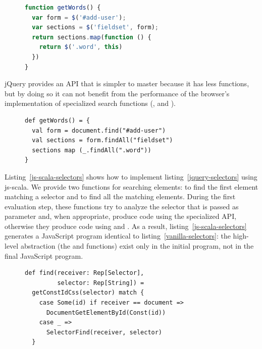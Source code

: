 \documentclass[preprint]{sigplanconf}
\begin{document}
\begin{figure}
\begin{lstlisting}[language=JavaScript,label=jquery-selectors,caption=Searching elements in jQuery]
function getWords() {
  var form = $('#add-user');
  var sections = $('fieldset', form);
  return sections.map(function () {
    return $('.word', this)
  })
}
\end{lstlisting}
\end{figure}

jQuery provides an API that is simpler to master because it has less functions, but by doing so it
can not benefit from the performance of the browser’s implementation of specialized search functions
(,  and ).

\begin{figure}
\begin{lstlisting}[label=js-scala-selectors,caption=Searching elements in js-scala]
def getWords() = {
  val form = document.find("#add-user")
  val sections = form.findAll("fieldset")
  sections map (_.findAll(".word"))
}
\end{lstlisting}
\end{figure}

Listing~\ref{js-scala-selectors} shows how to implement listing~\ref{jquery-selectors} using
js-scala. We provide two functions for searching elements:  to find the first element
matching a selector and  to find all the matching elements. During the first
evaluation step, these functions try to analyze the selector that is passed as parameter and, when
appropriate, produce code using the specialized API, otherwise they produce  code using
 and . As a result, listing~\ref{js-scala-selectors}
generates a JavaScript program identical to listing~\ref{vanilla-selectors}: the high-level
abstraction (the  and  functions) exist only in the initial program, not in
the final JavaScript program.

\begin{figure}
\begin{lstlisting}[label=selector-impl,caption=Selectors optimization]
def find(receiver: Rep[Selector],
         selector: Rep[String]) =
  getConstIdCss(selector) match {
    case Some(id) if receiver == document =>
      DocumentGetElementById(Const(id))
    case _ =>
      SelectorFind(receiver, selector)
  }
\end{lstlisting}
\end{figure}
\end{document}
